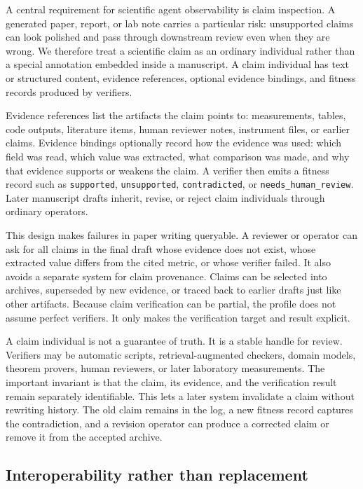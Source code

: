 \documentclass{article}
\begin{document}
A central requirement for scientific agent observability is claim inspection. A generated paper, report, or lab note carries a particular risk: unsupported claims can look polished and pass through downstream review even when they are wrong. We therefore treat a scientific claim as an ordinary individual rather than a special annotation embedded inside a manuscript. A claim individual has text or structured content, evidence references, optional evidence bindings, and fitness records produced by verifiers.

Evidence references list the artifacts the claim points to: measurements, tables, code outputs, literature items, human reviewer notes, instrument files, or earlier claims. Evidence bindings optionally record how the evidence was used: which field was read, which value was extracted, what comparison was made, and why that evidence supports or weakens the claim. A verifier then emits a fitness record such as \texttt{supported}, \texttt{unsupported}, \texttt{contradicted}, or \texttt{needs\_human\_review}. Later manuscript drafts inherit, revise, or reject claim individuals through ordinary operators.

This design makes failures in paper writing queryable. A reviewer or operator can ask for all claims in the final draft whose evidence does not exist, whose extracted value differs from the cited metric, or whose verifier failed. It also avoids a separate system for claim provenance. Claims can be selected into archives, superseded by new evidence, or traced back to earlier drafts just like other artifacts. Because claim verification can be partial, the profile does not assume perfect verifiers. It only makes the verification target and result explicit.

A claim individual is not a guarantee of truth. It is a stable handle for review. Verifiers may be automatic scripts, retrieval-augmented checkers, domain models, theorem provers, human reviewers, or later laboratory measurements. The important invariant is that the claim, its evidence, and the verification result remain separately identifiable. This lets a later system invalidate a claim without rewriting history. The old claim remains in the log, a new fitness record captures the contradiction, and a revision operator can produce a corrected claim or remove it from the accepted archive.

\subsection{Interoperability rather than replacement}
\end{document}
